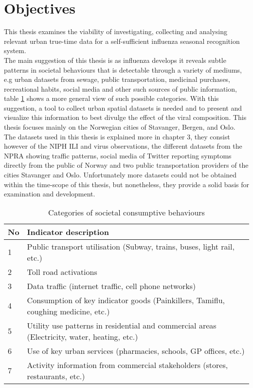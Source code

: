 \section{Objectives}
This thesis examines the viability of investigating, collecting and analysing relevant urban true-time data for a self-sufficient influenza seasonal recognition system.\\
The main suggestion of this thesis is as influenza develops it reveals subtle patterns in societal behaviours that is detectable through a variety of mediums, e.g urban datasets from sewage, public transportation, medicinal purchases, recreational habits, social media and other such sources of public information, table \ref{table:2} shows a more general view of such possible categories. With this suggestion, a tool to collect urban spatial datasets is needed and to present and visualize this information to best divulge the effect of the viral composition. This thesis focuses mainly on the Norwegian cities of Stavanger, Bergen, and Oslo. The datasets used in this thesis is explained more in chapter 3, they consist however of the NIPH ILI and virus observations, the different datasets from the NPRA showing traffic patterns, social media of Twitter reporting symptoms directly from the public of Norway and two public transportation providers of the cities Stavanger and Oslo. Unfortunately more datasets could not be obtained within the time-scope of this thesis, but nonetheless, they provide a solid basis for examination and development.


\begin{table}[!htb]
\begin{tabular}{ | m{2em} | m{13.4cm}| }
 \hline
 \textbf{No} & \textbf{Indicator description} \\ [0.5ex] 
 \hline
 1 & Public transport utilisation (Subway, trains, buses, light rail, etc.) \\ 
  \hline
 2 & Toll road activations \\
  \hline
 3 & Data traffic (internet traffic, cell phone networks) \\
  \hline
 4 & Consumption of key indicator goods (Painkillers, Tamiflu, coughing medicine, etc.) \\
  \hline
 5 & Utility use patterns in residential and commercial areas (Electricity, water, heating, etc.) \\
 \hline
 6 & Use of key urban services (pharmacies, schools, GP offices, etc.) \\  
 \hline
 7 & Activity information from commercial stakeholders (stores, restaurants, etc.) \\ 
 \hline
\end{tabular}
 \caption{Categories of societal consumptive behaviours}
 \label{table:2}
\end{table}




